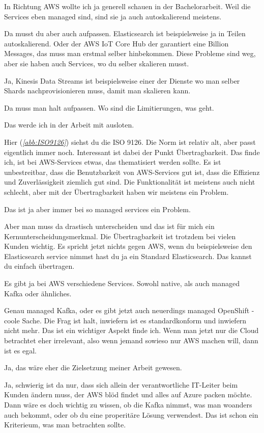 \LF In Richtung \ac{AWS} wollte ich ja generell schauen in der Bachelorarbeit. Weil die Services eben managed sind, sind sie ja auch autoskalierend meistens.

\RB Da musst du aber auch aufpassen. Elasticsearch ist beispielsweise ja in Teilen autoskalierend. Oder der AWS IoT Core Hub der garantiert eine Billion Messages, das muss man erstmal selber hinbekommen. Diese Probleme sind weg, aber sie haben auch Services, wo du selber skalieren musst. 

\LF Ja, Kinesis Data Streams ist beispielsweise einer der Dienste wo man selber Shards nachprovisionieren muss, damit man skalieren kann.

\RB Da muss man halt aufpassen. Wo sind die Limitierungen, was geht.

\LF Das werde ich in der Arbeit mit ausloten.

\RB Hier (\textit{\autoref{abb:ISO9126}}) siehst du die ISO 9126. Die Norm ist relativ alt, aber passt eigentlich immer noch. Interessant ist dabei der Punkt Übertragbarkeit. Das finde ich, ist bei \ac{AWS}-Services etwas, das thematisiert werden sollte. Es ist unbestreitbar, dass die Benutzbarkeit von \ac{AWS}-Services gut ist, dass die Effizienz und Zuverlässigkeit ziemlich gut sind. Die Funktionalität ist meistens auch nicht schlecht, aber mit der Übertragbarkeit haben wir meistens ein Problem.

\LF Das ist ja aber immer bei so managed services ein Problem.

\RB Aber man muss da drastisch unterscheiden und das ist für mich ein Kernunterscheidungsmerkmal. Die Übertragbarkeit ist trotzdem bei vielen Kunden wichtig. Es spricht jetzt nichts gegen \ac{AWS}, wenn du beispielsweise den Elasticsearch service nimmst hast du ja ein Standard Elasticsearch. Das kannst du einfach übertragen.

\LF Es gibt ja bei \ac{AWS} verschiedene Services. Sowohl native, als auch managed Kafka oder ähnliches.

\RB Genau managed Kafka, oder es gibt jetzt auch neuerdings managed OpenShift - coole Sache. Die Frag ist  halt, inwiefern ist es standardkonform und inwiefern nicht mehr. Das ist ein wichtiger Aspekt finde ich. Wenn man jetzt nur die Cloud betrachtet eher irrelevant, also wenn jemand sowieso nur \ac{AWS} machen will, dann ist es egal.

\LF Ja, das wäre eher die Zielsetzung meiner Arbeit gewesen.

\RB Ja, schwierig ist da nur, dass sich allein der verantwortliche IT-Leiter beim Kunden ändern muss, der \ac{AWS} blöd findet und alles auf Azure packen möchte. Dann wäre es doch wichtig zu wissen, ob die Kafka nimmst, was man woanders auch bekommt, oder ob du eine properitäre Lösung verwendest. Das ist schon ein Kriterieum, was man betrachten sollte.

